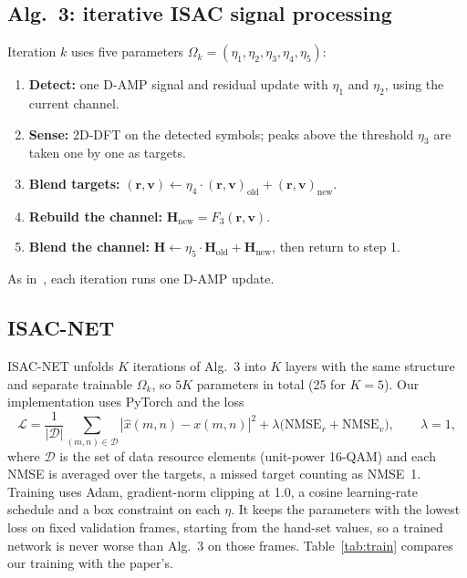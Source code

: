 \documentclass[11pt,a4paper]{article}
\newcommand{\BH}{\mathbf{H}}
\begin{document}
\subsection{Alg.~3: iterative ISAC signal processing}
Iteration $k$ uses five parameters $\Omega_k=(\eta_1,\eta_2,\eta_3,\eta_4,\eta_5)$:
\begin{enumerate}
  \item \textbf{Detect:} one D-AMP signal and residual update with $\eta_1$ and $\eta_2$, using the current channel.
  \item \textbf{Sense:} 2D-DFT on the detected symbols; peaks above the threshold $\eta_3$ are taken one by one as targets.
  \item \textbf{Blend targets:} $(\mathbf{r},\mathbf{v})\leftarrow\eta_4\cdot(\mathbf{r},\mathbf{v})_{\text{old}}+(\mathbf{r},\mathbf{v})_{\text{new}}$.
  \item \textbf{Rebuild the channel:} $\BH_{\text{new}}=F_3(\mathbf{r},\mathbf{v})$.
  \item \textbf{Blend the channel:} $\BH\leftarrow\eta_5\cdot\BH_{\text{old}}+\BH_{\text{new}}$, then return to step 1.
\end{enumerate}
As in~\cite{isacnet}, each iteration runs one D-AMP update.

\subsection{ISAC-NET}
ISAC-NET unfolds $K$ iterations of Alg.~3 into $K$ layers with the same structure and separate trainable $\Omega_k$, so $5K$ parameters in total (25 for $K=5$). Our implementation uses PyTorch and the loss
\begin{equation}
  \mathcal{L}=\frac{1}{|\mathcal{D}|}\sum_{(m,n)\in\mathcal{D}}|\hat{x}(m,n)-x(m,n)|^2+\lambda\big(\mathrm{NMSE}_r+\mathrm{NMSE}_v\big),\qquad\lambda=1,
\end{equation}
where $\mathcal{D}$ is the set of data resource elements (unit-power 16-QAM) and each NMSE is averaged over the targets, a missed target counting as NMSE~1. Training uses Adam, gradient-norm clipping at 1.0, a cosine learning-rate schedule and a box constraint on each $\eta$. It keeps the parameters with the lowest loss on fixed validation frames, starting from the hand-set values, so a trained network is never worse than Alg.~3 on those frames. Table~\ref{tab:train} compares our training with the paper's.
\end{document}
